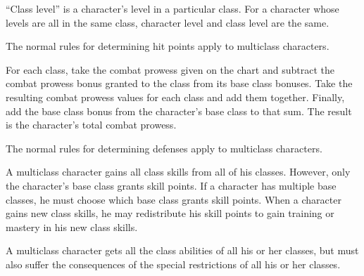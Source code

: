         \par ``Class level'' is a character's level in a particular class.
        For a character whose levels are all in the same class, character level and class level are the same.

        The normal rules for determining hit points apply to multiclass characters.

        For each class, take the combat prowess given on the chart and subtract the combat prowess bonus granted to the class from its base class bonuses.
        Take the resulting combat prowess values for each class and add them together.
        Finally, add the base class bonus from the character's base class to that sum.
        The result is the character's total combat prowess.

        The normal rules for determining defenses apply to multiclass characters.

        A multiclass character gains all class skills from all of his classes.
        However, only the character's base class grants skill points.
        If a character has multiple base classes, he must choose which base class grants skill points.
        When a character gains new class skills, he may redistribute his skill points to gain training or mastery in his new class skills.

        A multiclass character gets all the class abilities of all his or her classes, but must also suffer the consequences of the special restrictions of all his or her classes.

